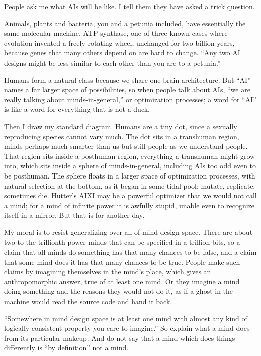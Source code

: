 
People ask me what AIs will be like. I tell them they have asked a trick question.

Animals, plants and bacteria, you and a petunia included, have essentially the same molecular machine, ATP synthase, one of three known cases where evolution invented a freely rotating wheel, unchanged for two billion years, because genes that many others depend on are hard to change. ``Any two AI designs might be less similar to each other than you are to a petunia.''

Humans form a natural class because we share one brain architecture. But ``AI'' names a far larger space of possibilities, so when people talk about AIs, ``we are really talking about minds-in-general,'' or optimization processes; a word for ``AI'' is like a word for everything that is not a duck. 

Then I draw my standard diagram. Humans are a tiny dot, since a sexually reproducing species cannot vary much. The dot sits in a transhuman region, minds perhaps much smarter than us but still people as we understand people. That region sits inside a posthuman region, everything a transhuman might grow into, which sits inside a sphere of minds-in-general, including AIs too odd even to be posthuman. The sphere floats in a larger space of optimization processes, with natural selection at the bottom, as it began in some tidal pool: mutate, replicate, sometimes die. Hutter's AIXI may be a powerful optimizer that we would not call a mind; for a mind of infinite power it is awfully stupid, unable even to recognize itself in a mirror. But that is for another day.

My moral is to resist generalizing over all of mind design space.  There are about two to the trillionth power minds that can be specified in a trillion bits, so a claim that all minds do something has that many chances to be false, and a claim that some mind does it has that many chances to be true. People make such claims by imagining themselves in the mind's place, which gives an anthropomorphic answer, true of at least one mind. Or they imagine a mind doing something and the reasons they would not do it, as if a ghost in the machine would read the source code and hand it back.

``Somewhere in mind design space is at least one mind with almost any kind of logically consistent property you care to imagine.'' So explain what a mind does from its particular makeup. And do not say that a mind which does things differently is ``by definition'' not a mind.
